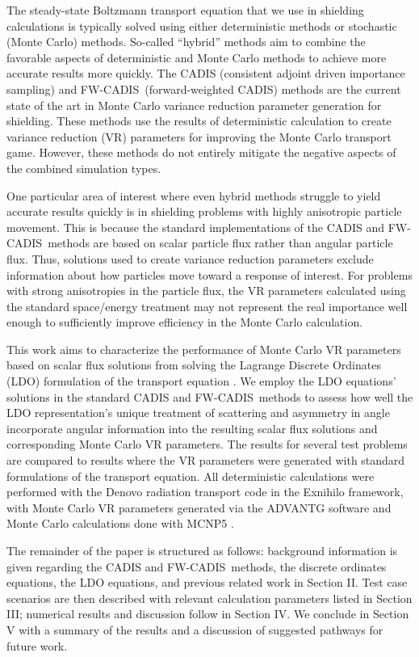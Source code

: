 \documentclass{article} %
\newcommand{\fwc}{\mbox{FW-CADIS}}
\begin{document}
The steady-state Boltzmann transport equation that we use in shielding
calculations is typically solved using either deterministic methods or
stochastic (Monte Carlo) methods. So-called ``hybrid'' methods aim to combine
the favorable aspects of deterministic and Monte Carlo methods to achieve more
accurate results more quickly. The CADIS (consistent adjoint driven importance
sampling) \cite{cadis} and \fwc\ (forward-weighted CADIS) \cite{fwcadis}
methods are the current state of the art in Monte Carlo variance reduction
parameter generation for shielding. These methods use the results of
deterministic calculation to create variance reduction (VR) parameters for
improving the Monte Carlo transport game. However, these methods do not
entirely mitigate the negative aspects of the combined simulation types.

One particular area of interest where even hybrid methods struggle to yield
accurate results quickly is in shielding problems with highly anisotropic
particle movement. This is because the standard implementations of the CADIS
and \fwc\ methods are based on scalar particle flux rather than angular
particle flux. Thus, solutions used to create variance reduction parameters
exclude information about how particles move toward a response of interest.
For problems with strong anisotropies in the particle flux, the VR parameters
calculated using the standard space/energy treatment may not represent the
real importance well enough to sufficiently improve efficiency in the Monte
Carlo calculation.

This work aims to characterize the performance of Monte Carlo VR
parameters based on scalar flux solutions from solving the Lagrange Discrete
Ordinates (LDO) formulation of the transport equation \cite{ahrens}. We employ
the LDO equations' solutions in the standard CADIS and \fwc\ methods to assess
how well the LDO representation's unique treatment of scattering and asymmetry
in angle incorporate angular information into the resulting scalar flux
solutions and corresponding Monte Carlo VR parameters. The results for
several test problems are compared to results where the VR parameters
were generated with standard formulations of the transport equation. All
deterministic calculations were performed with the Denovo radiation transport
code \cite{denovo} in the Exnihilo framework, with Monte Carlo VR
parameters generated via the ADVANTG software \cite{advantg} and Monte Carlo
calculations done with MCNP5 \cite{mcnp}.

The remainder of the paper is structured as follows: background information is
given regarding the CADIS and \fwc\ methods, the discrete ordinates equations,
the LDO equations, and previous related work in Section II. Test case
scenarios are then described with relevant calculation parameters listed in
Section III; numerical results and discussion follow in Section IV. We
conclude in Section V with a summary of the results and a discussion of
suggested pathways for future work.
\end{document}
